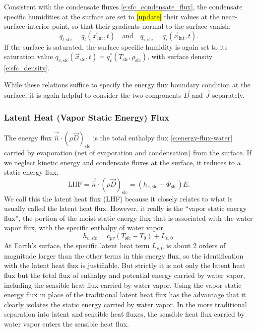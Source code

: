 \documentclass{report}
\begin{document}
\begin{enumerate}
    Consistent with the condensate fluxes \eqref{e:sfc_condensate_flux}, the condensate specific humidities at the surface are set to \hl{[update]} their values at the near-surface interior point, so that their gradients normal to the surface vanish:
    \[
    q_{l, \mathrm{sfc}} = q_l(\vec{x}_\mathrm{int}, t) \quad \text{and} \quad q_{i, \mathrm{sfc}} = q_i(\vec{x}_\mathrm{int}, t).
    \]
    If the surface is saturated, the surface specific humidity is again set to its saturation value $q_{v, \mathrm{sfc}}(\vec{x}_\mathrm{sfc}, t) =q_v^*(T_\mathrm{sfc}, \rho_\mathrm{sfc})$, with surface density \eqref{e:sfc_density}.
\end{enumerate}
While these relations suffice to specify the energy flux boundary condition at the surface, it is again helpful to consider the two components $\vec{D}$ and $\vec{J}$ separately. 

\subsubsection{Latent Heat (Vapor Static Energy) Flux}

The energy flux $\vec{\hat n} \cdot (\rho \vec{D})_{\mathrm{sfc}}$ is the total enthalpy flux \eqref{e:energy-flux-water} carried by evaporation (net of evaporation and condensation) from the surface. If we neglect kinetic energy and condensate fluxes at the surface, it reduces to a static energy flux,
\begin{equation}\label{e:sfc_LHF}
     \mathrm{LHF} = \vec{\hat n} \cdot (\rho \vec{D})_{\mathrm{sfc}}   = (h_{v, \mathrm{sfc}} + \Phi_\mathrm{sfc}) E.
\end{equation}
We call this the latent heat flux (LHF) because it closely relates to what is usually called the latent heat flux. However, it really is the ``vapor static energy flux'', the portion of the moist static energy flux that is associated with the water vapor flux, with the specific enthalpy of water vapor
\[
h_{v, \mathrm{sfc}} = c_{pv} (T_\mathrm{sfc}-T_0) + L_{v,0}.
\]
At Earth's surface, the specific latent heat term $L_{v,0}$ is about 2 orders of magnitude larger than the other terms in this energy flux, so the identification with the latent heat flux is justifiable. But strictly it is not only the latent heat flux but the total flux of enthalpy and potential energy carried by water vapor, including the sensible heat flux carried by water vapor. Using the vapor static energy flux in place of the traditional latent heat flux has the advantage that it clearly isolates the static energy carried by water vapor. In the more traditional separation into latent and sensible heat fluxes, the sensible heat flux carried by water vapor enters the sensible heat flux.
\end{document}
